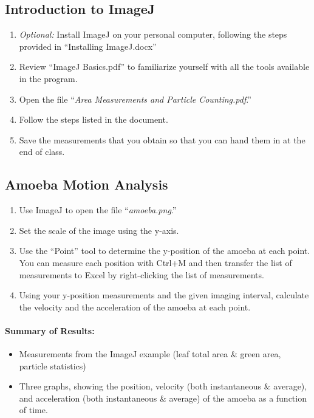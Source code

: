 \subsection{Introduction to ImageJ}
\begin{enumerate}
\item \emph{Optional:} Install ImageJ on your personal computer, following the steps provided in ``Installing ImageJ.docx''
\item Review ``ImageJ Basics.pdf'' to familiarize yourself with all the tools available in the program.
\item Open the file ``\textit{Area Measurements and Particle Counting.pdf}.''
\item Follow the steps listed in the document.
\item Save the measurements that you obtain so that you can hand them in at the end of class.
\end{enumerate}

\subsection{Amoeba Motion Analysis}
\begin{enumerate}
\item Use ImageJ to open the file ``\textit{amoeba.png}.''
\item Set the scale of the image using the y-axis.
\item Use the ``Point'' tool to determine the y-position of the amoeba at each point.
You can measure each position with Ctrl+M and then transfer the list of measurements to Excel by right-clicking the list of measurements.
\item Using your y-position measurements and the given imaging interval, calculate the velocity and the acceleration of the amoeba at each point. 
\end{enumerate}

\paragraph{ Summary of Results:}
\begin{itemize}
\item Measurements from the ImageJ example (leaf total area \& green area, particle statistics)
\item Three graphs, showing the position, velocity (both instantaneous \& average), and acceleration (both instantaneous \& average) of the amoeba as a function of time.
\end{itemize}


